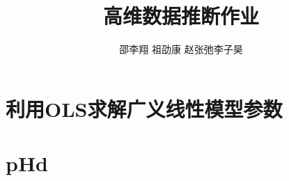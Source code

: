 \documentclass[cn,11pt]{elegantpaper}
\title{高维数据推断作业}
\author{邵李翔 \quad 祖劭康 \quad 赵张弛\quad 李子昊}
\date{}
\begin{document}
    


\maketitle
\newpage
\tableofcontents

\newpage
\section{利用OLS求解广义线性模型参数}



\section{pHd}

%  

%  
\end{document}
